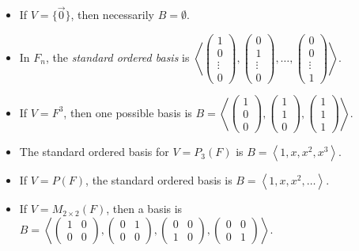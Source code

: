 \documentclass[12pt]{article}
\begin{document}
\begin{exmp}\proofbreak
    \begin{itemize}
        \item If $V = \{\vec{0}\}$, then necessarily $B = \emptyset$.
        \item In $F_n$, the \emph{standard ordered basis} is $\left\langle \begin{pmatrix}1 \\ 0 \\ \vdots \\ 0\end{pmatrix}, \begin{pmatrix}0 \\ 1 \\ \vdots \\ 0\end{pmatrix}, \ldots, \begin{pmatrix}0 \\ 0 \\ \vdots \\ 1\end{pmatrix}\right\rangle$.
        \item If $V = F^3$, then one possible basis is $B = \left\langle \begin{pmatrix}1 \\ 0 \\ 0\end{pmatrix}, \begin{pmatrix}1 \\ 1 \\ 0\end{pmatrix}, \begin{pmatrix}1 \\ 1 \\ 1\end{pmatrix}\right\rangle$.
        \item The standard ordered basis for $V = P_3(F)$ is $B = \left\langle 1, x, x^2, x^3 \right\rangle$.
        \item If $V = P(F)$, the standard ordered basis is $B = \left\langle 1, x, x^2, \ldots \right\rangle$.
        \item If $V = M_{2\times 2}(F)$, then a basis is $B = \left\langle
        \begin{pmatrix}1 & 0 \\ 0 & 0\end{pmatrix},
        \begin{pmatrix}0 & 1 \\ 0 & 0\end{pmatrix},
        \begin{pmatrix}0 & 0 \\ 1 & 0\end{pmatrix},
        \begin{pmatrix}0 & 0 \\ 0 & 1\end{pmatrix}\right\rangle$.
    \end{itemize}
\end{exmp}
\end{document}
